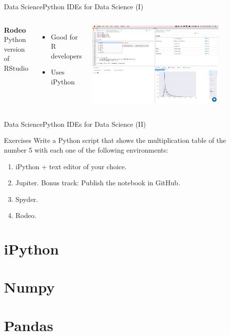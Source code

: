 \documentclass[10pt,compress]{beamer} %
\begin{document}
\begin{frame}{Data Science}{Python IDEs for Data Science (I)}
\begin{columns}
	   \centering \textbf{Rodeo}\\
		Python version of RStudio
		\begin{itemize}
			\item Good for R developers
			\item Uses iPython
		\end{itemize}

		\includegraphics[width=0.8\textwidth]{figs/rodeo.png}	
	\end{columns}
\end{frame}

\begin{frame}{Data Science}{Python IDEs for Data Science (II)}
    \begin{block}{Exercises}
		Write a Python script that shows the multiplication table of the number 5 with each one of the following environments:
   		\begin{enumerate}
   		\item iPython + text editor of your choice.
		\item Jupiter. Bonus track: Publish the notebook in GitHub.
		\item Spyder.
		\item Rodeo.
		\end{enumerate}
	\end{block}
\end{frame}

\section{iPython}
\section{Numpy}
\section{Pandas}
\end{document}
